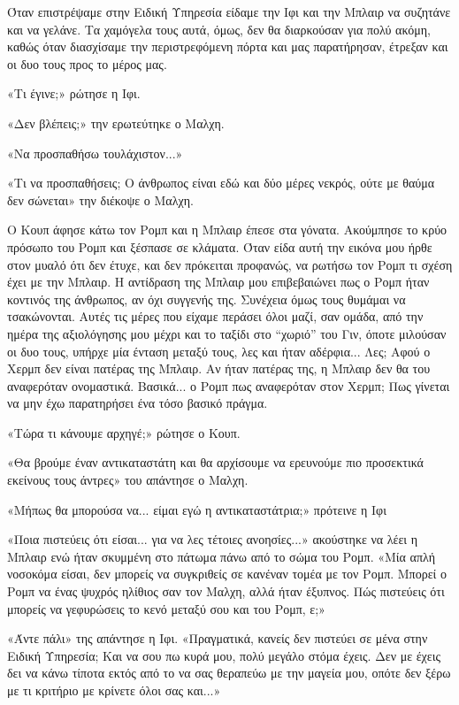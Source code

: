 \documentclass[12pt,twoside, openany]{book}
\begin{document}
Όταν επιστρέψαμε στην Ειδική Υπηρεσία είδαμε την Ιφι και την Μπλαιρ να συζητάνε και να γελάνε. Τα χαμόγελα τους αυτά, όμως, δεν θα διαρκούσαν για πολύ ακόμη, καθώς όταν διασχίσαμε την περιστρεφόμενη πόρτα και μας παρατήρησαν, έτρεξαν και οι δυο τους προς το μέρος μας.

«Τι έγινε;» ρώτησε η Ιφι.

«Δεν βλέπεις;» την ερωτεύτηκε ο Μαλχη.

«Να προσπαθήσω τουλάχιστον...»

«Τι να προσπαθήσεις; Ο άνθρωπος είναι εδώ και δύο μέρες νεκρός, ούτε με θαύμα δεν σώνεται» την διέκοψε ο Μαλχη.

Ο Κουπ άφησε κάτω τον Ρομπ και η Μπλαιρ έπεσε στα γόνατα. Ακούμπησε το κρύο πρόσωπο του Ρομπ και ξέσπασε σε κλάματα. Όταν είδα αυτή την εικόνα μου ήρθε στον μυαλό ότι δεν έτυχε, και δεν πρόκειται προφανώς, να ρωτήσω τον Ρομπ τι σχέση έχει με την Μπλαιρ. Η αντίδραση της Μπλαιρ μου επιβεβαιώνει πως ο Ρομπ ήταν κοντινός της άνθρωπος, αν όχι συγγενής της. Συνέχεια όμως τους θυμάμαι να τσακώνονται. Αυτές τις μέρες που είχαμε περάσει όλοι μαζί, σαν ομάδα, από την ημέρα της αξιολόγησης μου μέχρι και το ταξίδι στο “χωριό” του Γιν, όποτε μιλούσαν οι δυο τους, υπήρχε μία ένταση μεταξύ τους, λες και ήταν αδέρφια... Λες; Αφού ο Χερμπ δεν είναι πατέρας της Μπλαιρ. Αν ήταν πατέρας της, η Μπλαιρ δεν θα του αναφερόταν ονομαστικά. Βασικά... ο Ρομπ πως αναφερόταν στον Χερμπ; Πως γίνεται να μην έχω παρατηρήσει ένα τόσο βασικό πράγμα.

«Τώρα τι κάνουμε αρχηγέ;» ρώτησε ο Κουπ.

«Θα βρούμε έναν αντικαταστάτη και θα αρχίσουμε να ερευνούμε πιο προσεκτικά εκείνους τους άντρες» του απάντησε ο Μαλχη. 

«Μήπως θα μπορούσα να... είμαι εγώ η αντικαταστάτρια;» πρότεινε η Ιφι

«Ποια πιστεύεις ότι είσαι... για να λες τέτοιες ανοησίες...» ακούστηκε να λέει η Μπλαιρ ενώ ήταν σκυμμένη στο πάτωμα πάνω από το σώμα του Ρομπ. «Μία απλή νοσοκόμα είσαι, δεν μπορείς να συγκριθείς σε κανέναν τομέα με τον Ρομπ. Μπορεί ο Ρομπ να ένας ψυχρός ηλίθιος σαν τον Μαλχη, αλλά ήταν έξυπνος. Πώς πιστεύεις ότι μπορείς να γεφυρώσεις το κενό μεταξύ σου και του Ρομπ, ε;»

«Άντε πάλι» της απάντησε η Ιφι. «Πραγματικά, κανείς δεν πιστεύει σε μένα στην Ειδική Υπηρεσία; Και να σου πω κυρά μου, πολύ μεγάλο στόμα έχεις. Δεν με έχεις δει να κάνω τίποτα εκτός από το να σας θεραπεύω με την μαγεία μου, οπότε δεν ξέρω με τι κριτήριο με κρίνετε όλοι σας και...»
\end{document}
